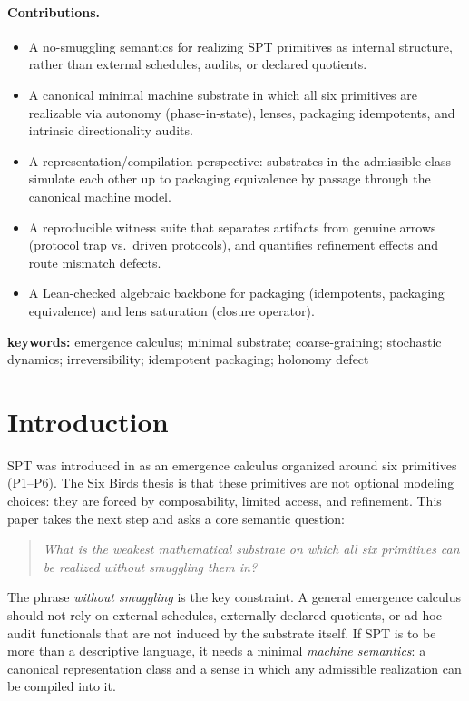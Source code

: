 \documentclass[11pt]{article}
\theoremstyle{definition}
\theoremstyle{remark}
\begin{document}
\paragraph{Contributions.}
\begin{itemize}[leftmargin=*, itemsep=0.25em]
  \item A no-smuggling semantics for realizing SPT primitives as internal structure, rather than external schedules, audits, or declared quotients.
  \item A canonical minimal machine substrate in which all six primitives are realizable via autonomy (phase-in-state), lenses, packaging idempotents, and intrinsic directionality audits.
  \item A representation/compilation perspective: substrates in the admissible class simulate each other up to packaging equivalence by passage through the canonical machine model.
  \item A reproducible witness suite that separates artifacts from genuine arrows (protocol trap vs.\ driven protocols), and quantifies refinement effects and route mismatch defects.
  \item A Lean-checked algebraic backbone for packaging (idempotents, packaging equivalence) and lens saturation (closure operator).
\end{itemize}

\noindent\textbf{keywords:} emergence calculus; minimal substrate; coarse-graining; stochastic dynamics; irreversibility; idempotent packaging; holonomy defect
 
\section{Introduction}
\label{sec:introduction}

SPT was introduced in \citet{sixbirds2026} as an emergence calculus organized around six primitives (P1--P6).
The Six Birds thesis is that these primitives are not optional modeling choices: they are forced by composability, limited access, and refinement.
This paper takes the next step and asks a core semantic question:

\begin{quote}
\emph{What is the weakest mathematical substrate on which all six primitives can be realized without smuggling them in?}
\end{quote}

The phrase \emph{without smuggling} is the key constraint.
A general emergence calculus should not rely on external schedules, externally declared quotients, or ad hoc audit functionals that are not induced by the substrate itself.
If SPT is to be more than a descriptive language, it needs a minimal \emph{machine semantics}: a canonical representation class and a sense in which any admissible realization can be compiled into it.
\end{document}
